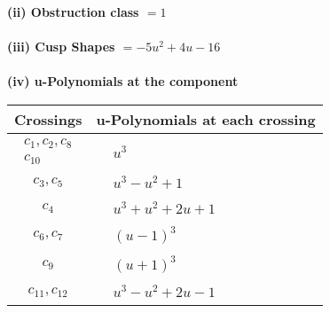 \documentclass[1p]{elsarticle_modified}
\theoremstyle{definition}
\begin{document}
\flushleft \textbf{(ii) Obstruction class $= 1$}\\~\\
\flushleft \textbf{(iii) Cusp Shapes $= -5 u^2+4 u-16$}\\~\\
\newpage\renewcommand{\arraystretch}{1}
\flushleft \textbf{(iv) u-Polynomials at the component}\newline \\
\begin{tabular}{m{50pt}|m{274pt}}
Crossings & \hspace{64pt}u-Polynomials at each crossing \\
\hline $$\begin{aligned}c_{1},c_{2},c_{8}\\c_{10}\end{aligned}$$&$\begin{aligned}
&u^3
\end{aligned}$\\
\hline $$\begin{aligned}c_{3},c_{5}\end{aligned}$$&$\begin{aligned}
&u^3- u^2+1
\end{aligned}$\\
\hline $$\begin{aligned}c_{4}\end{aligned}$$&$\begin{aligned}
&u^3+u^2+2 u+1
\end{aligned}$\\
\hline $$\begin{aligned}c_{6},c_{7}\end{aligned}$$&$\begin{aligned}
&(u-1)^3
\end{aligned}$\\
\hline $$\begin{aligned}c_{9}\end{aligned}$$&$\begin{aligned}
&(u+1)^3
\end{aligned}$\\
\hline $$\begin{aligned}c_{11},c_{12}\end{aligned}$$&$\begin{aligned}
&u^3- u^2+2 u-1
\end{aligned}$\\
\hline
\end{tabular}\\~\\
\end{document}
